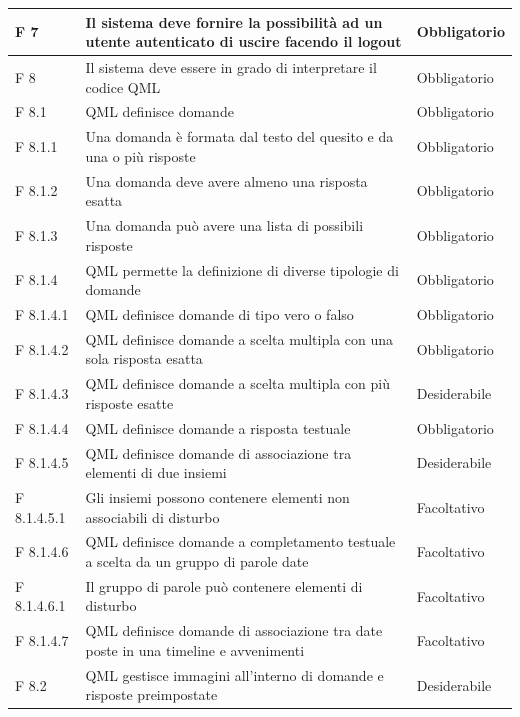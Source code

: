 \documentclass[a4paper,11pt]{article}
\begin{document}
\begin{longtable}{p{}p{}p{}}
\midrule
F 7 & Il sistema deve fornire la possibilità ad un utente autenticato di uscire facendo il logout & Obbligatorio\\
\midrule
F 8 & Il sistema deve essere in grado di interpretare il codice QML & Obbligatorio\\
\midrule
F 8.1 & QML definisce domande & Obbligatorio\\
\midrule
F 8.1.1 & Una domanda è formata dal testo del quesito e da una o più risposte & Obbligatorio\\
\midrule
F 8.1.2 & Una domanda deve avere almeno una risposta esatta & Obbligatorio\\
\midrule
F 8.1.3 & Una domanda può avere una lista di possibili risposte & Obbligatorio\\
\midrule
F 8.1.4 & QML permette la definizione di diverse tipologie di domande & Obbligatorio\\
\midrule
F 8.1.4.1 & QML definisce domande di tipo vero o falso & Obbligatorio\\
\midrule
F 8.1.4.2 & QML definisce domande a scelta multipla con una sola risposta esatta & Obbligatorio\\
\midrule
F 8.1.4.3 & QML definisce domande a scelta multipla con più risposte esatte & Desiderabile\\
\midrule
F 8.1.4.4 & QML definisce domande a risposta testuale & Obbligatorio\\
\midrule
F 8.1.4.5 & QML definisce domande di associazione tra elementi di due insiemi & Desiderabile\\
\midrule
F 8.1.4.5.1 & Gli insiemi possono contenere elementi non associabili di disturbo & Facoltativo\\
\midrule
F 8.1.4.6 & QML definisce domande a completamento testuale a scelta da un gruppo di parole date & Facoltativo\\
\midrule
F 8.1.4.6.1 & Il gruppo di parole può contenere elementi di disturbo & Facoltativo\\
\midrule
F 8.1.4.7 & QML definisce domande di associazione tra date poste in una timeline e avvenimenti & Facoltativo\\
\midrule
F 8.2 & QML gestisce immagini all'interno di domande e risposte preimpostate & Desiderabile\\
			
			\end{longtable}
\end{document}
